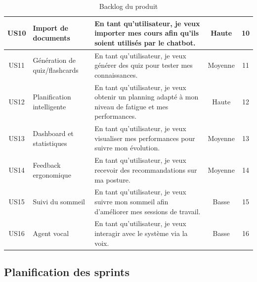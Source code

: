 {\begin{table}[H]
\begin{tabularx}{\textwidth}{|c|p{3cm}|X|c|c|}
US10 & Import de documents 
& En tant qu’utilisateur, je veux importer mes cours afin qu’ils soient utilisés par le chatbot. 
& Haute & 10 \\ \hline

US11 & Génération de quiz/flashcards 
& En tant qu’utilisateur, je veux générer des quiz pour tester mes connaissances. 
& Moyenne & 11 \\ \hline

US12 & Planification intelligente 
& En tant qu’utilisateur, je veux obtenir un planning adapté à mon niveau de fatigue et mes performances. 
& Haute & 12 \\ \hline

US13 & Dashboard et statistiques 
& En tant qu’utilisateur, je veux visualiser mes performances pour suivre mon évolution. 
& Moyenne & 13 \\ \hline

US14 & Feedback ergonomique 
& En tant qu’utilisateur, je veux recevoir des recommandations sur ma posture. 
& Moyenne & 14 \\ \hline

US15 & Suivi du sommeil 
& En tant qu’utilisateur, je veux suivre mon sommeil afin d’améliorer mes sessions de travail. 
& Basse & 15 \\ \hline

US16 & Agent vocal 
& En tant qu’utilisateur, je veux interagir avec le système via la voix. 
& Basse & 16 \\ \hline

\end{tabularx}

\caption{Backlog du produit}
\label{tab:backlog}
\end{table}
}


\subsection{Planification des sprints}

